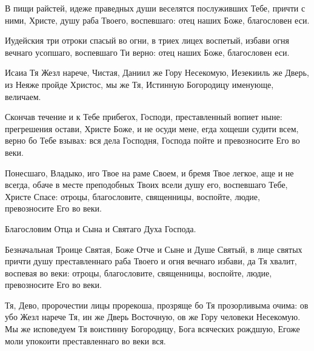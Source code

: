 \begin{mymulticols}
В пищи райстей, идеже праведных души веселятся послуживших Тебе, причти с ними, Христе, душу раба Твоего, воспевшаго: отец наших Боже, благословен еси. 

\slava 

Иудейския три отроки спасый во огни, в триех лицех воспетый, избави огня вечнаго усопшаго, воспевшаго Ти верно: отец наших Боже, благословен еси. 

\inyne 

Исаиа Тя Жезл нарече, Чистая, Даниил же Гору Несекомую, Иезекииль же Дверь, из Неяже пройде Христос, мы же Тя, Истинную Богородицу именующе, величаем. 

\vspace{\baselineskip}



Скончав течение и к Тебе прибегох, Господи, преставленный вопиет ныне: прегрешения остави, Христе Боже, и не осуди мене, егда хощеши судити всем, верно бо Тебе взывах: вся дела Господня, Господа пойте и превозносите Его во веки.


Понесшаго, Владыко, иго Твое на раме Своем, и бремя Твое легкое, аще и не всегда, обаче в месте преподобных Твоих всели душу его, воспевшаго Тебе, Христе Спасе: отроцы, благословите, священницы, воспойте, людие, превозносите Его во веки. 

Благословим Отца и Сына и Святаго Духа Господа. 

Безначальная Троице Святая, Боже Отче и Сыне и Душе Святый, в лице святых причти душу преставленнаго раба Твоего и огня вечнаго избави, да Тя хвалит, воспевая во веки: отроцы, благословите, священницы, воспойте, людие, превозносите Его во веки.

\inyne 

Тя, Дево, пророчестии лицы прорекоша, прозряще бо Тя прозорливыма очима: ов убо Жезл нарече Тя, ин же Дверь Восточную, ов же Гору человеки Несекомую. Мы же исповедуем Тя воистинну Богородицу, Бога всяческих рождшую, Егоже моли упокоити преставленнаго во веки вся.

\vspace{\baselineskip}


\end{mymulticols}
